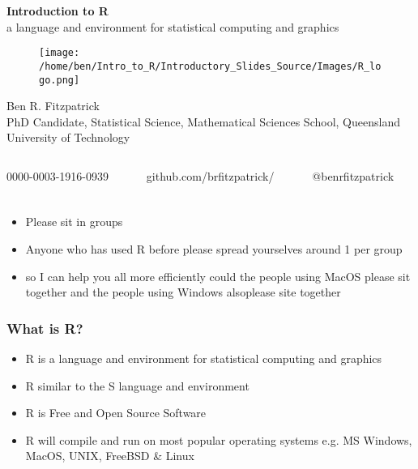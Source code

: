 \documentclass[xcolor=dvipsnames]{beamer}
\begin{document}
\begin{frame} %
\textbf{\huge Introduction to R}\\
a language and environment for statistical computing and graphics %

\begin{figure}
\texttt{[image: /home/ben/Intro\_to\_R/Introductory\_Slides\_Source/Images/R\_logo.png]}
\end{figure}
\small Ben R. Fitzpatrick\\
\tiny PhD Candidate, Statistical Science, Mathematical Sciences School, Queensland University of Technology
\newline
\begin{columns}
\begin{column}{3cm}
\tiny 0000-0003-1916-0939
\end{column}
\begin{column}{3cm}
\tiny github.com/brfitzpatrick/
\end{column}
\begin{column}{3cm}
\tiny @benrfitzpatrick
\end{column}
\end{columns}
\end{frame}

\begin{frame} 
\frametitle{}
\begin{itemize}
\item Please sit in groups
\item Anyone who has used R before please spread yourselves around 1 per group
\item so I can help you all more efficiently could the people using MacOS please sit together and the people using Windows alsoplease site together
\end{itemize}
\end{frame}

\begin{frame} 
\frametitle{What is R?}
\begin{itemize}
\item R is a language and environment for statistical computing and graphics
\newline
\item R similar to the S language and environment 
\newline
\item R is Free and Open Source Software
\newline
\item R will compile and run on most popular operating systems e.g. MS Windows, MacOS, UNIX, FreeBSD \& Linux
\end{itemize}
\end{frame}
\end{document}
